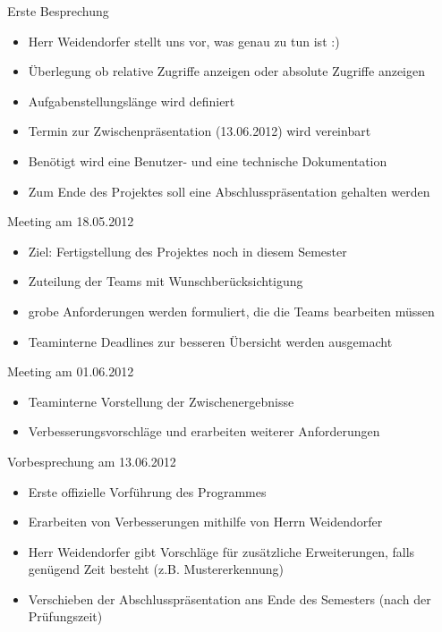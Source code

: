 \begin{frame}
\begin{block}{Erste Besprechung}
\begin{itemize}[<+->]
\pause\item Herr Weidendorfer stellt uns vor, was genau zu tun ist :)
\item Überlegung ob relative Zugriffe anzeigen oder absolute Zugriffe anzeigen
\item Aufgabenstellungslänge wird definiert
\item Termin zur Zwischenpräsentation (13.06.2012) wird vereinbart
\item Benötigt wird eine Benutzer- und eine technische Dokumentation
\item Zum Ende des Projektes soll eine Abschlusspräsentation gehalten werden
\end{itemize}
\end{block}
\end{frame}

\begin{frame}
\begin{block}{Meeting am 18.05.2012}
\begin{itemize}[<+->]
\pause\item Ziel: Fertigstellung des Projektes noch in diesem Semester
\item Zuteilung der Teams mit Wunschberücksichtigung
\item grobe Anforderungen werden formuliert, die die Teams bearbeiten müssen
\item Teaminterne Deadlines zur besseren Übersicht werden ausgemacht
\end{itemize}
\end{block}
\end{frame}

\begin{frame}
\begin{block}{Meeting am 01.06.2012}
\begin{itemize}[<+->]
\pause\item Teaminterne Vorstellung der Zwischenergebnisse
\item Verbesserungsvorschläge und erarbeiten weiterer Anforderungen
\end{itemize}
\end{block}
\end{frame}

\begin{frame}
\begin{block}{Vorbesprechung am 13.06.2012}
\begin{itemize}[<+->]
\pause\item Erste offizielle Vorführung des Programmes
\item Erarbeiten von Verbesserungen mithilfe von Herrn Weidendorfer
\item Herr Weidendorfer gibt Vorschläge für zusätzliche Erweiterungen, falls genügend Zeit besteht (z.B. Mustererkennung)
\item Verschieben der Abschlusspräsentation ans Ende des Semesters (nach der Prüfungszeit)
\end{itemize}
\end{block}
\end{frame}

